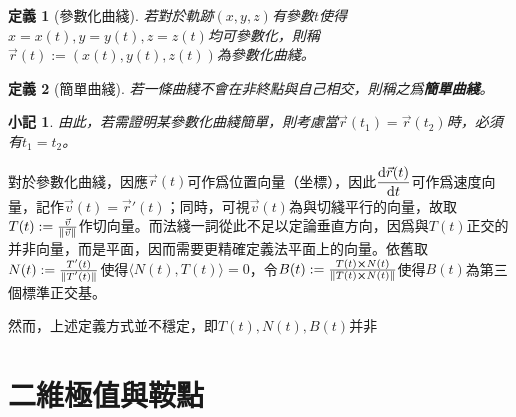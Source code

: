 \documentclass[12pt]{article}
\newcommand{\innerprod}[2]{\langle{#1},{#2}\rangle}
\newtheorem{definition}{定義}
\newtheorem*{remark}{小記}
\begin{document}
    \begin{definition}[參數化曲綫]
        若對於軌跡$(x,y,z)$有參數$t$使得$x=x(t),y=y(t),z=z(t)$均可參數化，則稱$\vec{r}(t):=(x(t),y(t),z(t))$為參數化曲綫。
    \end{definition}

    \begin{definition}[簡單曲綫]
        若一條曲綫不會在非終點與自己相交，則稱之爲\textbf{簡單曲綫}。
    \end{definition}

    \begin{remark}
        由此，若需證明某參數化曲綫簡單，則考慮當$\vec{r}(t_1)=\vec{r}(t_2)$時，必須有$t_1=t_2$。
    \end{remark}

    對於參數化曲綫，因應$\vec{r}(t)$可作爲位置向量（坐標），因此$\displaystyle \derivative{\vec{r}(t)}{t}$可作爲速度向量，記作$\vec{v}(t)=\vec{r}'(t)$；同時，可視$\vec{v}(t)$為與切綫平行的向量，故取$T(t):=\frac{\vec{v}}{\norm*{\vec{v}}}$作切向量。而法綫一詞從此不足以定論垂直方向，因爲與$T(t)$正交的并非向量，而是平面，因而需要更精確定義法平面上的向量。依舊取$N(t):=\frac{T'(t)}{\norm*{T'(t)}}$使得$\innerprod{N(t)}{T(t)}=0$，令$B(t):=\frac{T(t)\cross N(t)}{\norm*{T(t)\cross N(t)}}$使得$B(t)$為第三個標準正交基。

    然而，上述定義方式並不穩定，即$T(t),N(t),B(t)$并非

    \section*{二維極值與鞍點}
\end{document}
